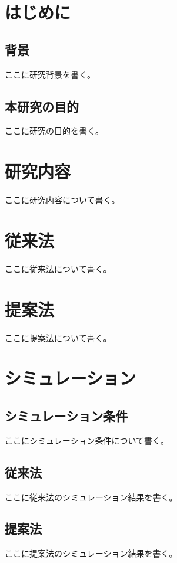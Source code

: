 \documentclass[10pt,onecolumn,fleqn]{jsarticle}
\begin{document}
\tableofcontents
\thispagestyle{empty}
\clearpage

\listoffigures
\listoftables
\thispagestyle{empty}
\clearpage


\section{はじめに}
\subsection{背景}
ここに研究背景を書く。

\subsection{本研究の目的}
ここに研究の目的を書く。

\section{研究内容}
ここに研究内容について書く。

\section{従来法}
ここに従来法について書く。

\section{提案法}
ここに提案法について書く。

\section{シミュレーション}
\subsection{シミュレーション条件}
ここにシミュレーション条件について書く。

\subsection{従来法}
ここに従来法のシミュレーション結果を書く。

\subsection{提案法}
ここに提案法のシミュレーション結果を書く。
\end{document}

